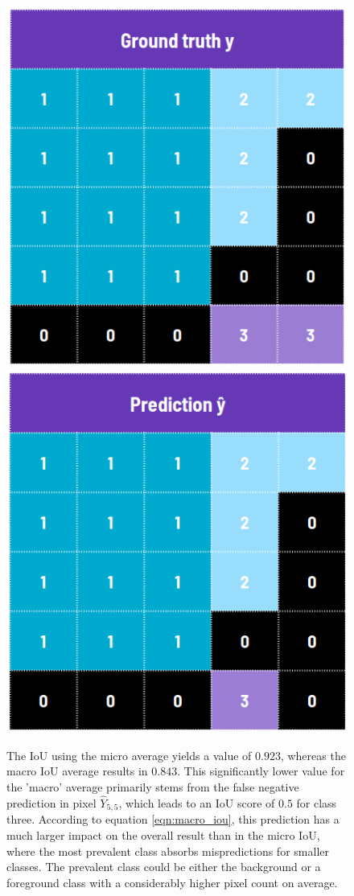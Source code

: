 \begin{figure}[H]
    \centering
    \includegraphics[width=\imgWidthTwo]{images/multiclass_example_y.png}
    \includegraphics[width=\imgWidthTwo]{images/multiclass_example_yhat.png}
    \caption[Multiclass classification]{The \ac{IoU} using the micro average yields a value of $0.923$, whereas the macro \ac{IoU} average results in $0.843$. This significantly lower value for the 'macro' average primarily stems from the false negative prediction in pixel $\hat{Y}_{5,5}$, which leads to an \ac{IoU} score of $0.5$ for class three. According to equation \ref{eqn:macro_iou}, this prediction has a much larger impact on the overall result than in the micro \ac{IoU}, where the most prevalent class absorbs mispredictions for smaller classes. The prevalent class could be either the background or a foreground class with a considerably higher pixel count on average.}
    \label{multiclass_classification}
\end{figure}
\newpage

